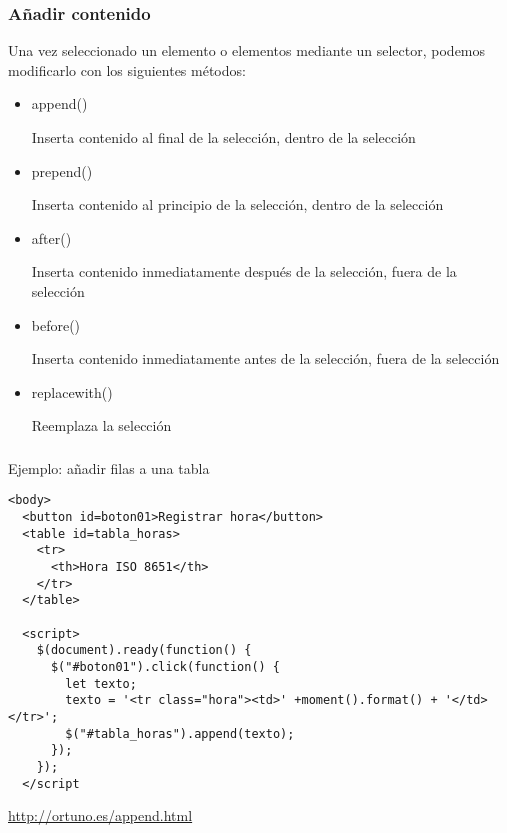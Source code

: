 \documentclass[ucs]{beamer}
\begin{document}
\begin{frame}[fragile]
\frametitle{Añadir contenido}
Una vez seleccionado un elemento o elementos
mediante un selector, podemos modificarlo con los siguientes métodos:

    \begin{itemize}
    \item
append()

Inserta contenido al final de la selección, dentro de la selección
    \item
prepend()

Inserta contenido al principio de la selección, dentro de la selección
    \item
after()

Inserta contenido inmediatamente después de la selección, fuera de la selección

    \item
before()

Inserta contenido inmediatamente antes de la selección, fuera de la selección

    \item
replacewith()

Reemplaza la selección
    \end{itemize}

\end{frame}


\begin{frame}[fragile]
\frametitle{}
Ejemplo: añadir filas a una tabla
  \begin{scriptsize}
  \begin{verbatim}
<body>
  <button id=boton01>Registrar hora</button>
  <table id=tabla_horas>
    <tr>
      <th>Hora ISO 8651</th>
    </tr>
  </table>

  <script>
    $(document).ready(function() {
      $("#boton01").click(function() {
        let texto;
        texto = '<tr class="hora"><td>' +moment().format() + '</td></tr>';
        $("#tabla_horas").append(texto);
      });
    });
  </script
  \end{verbatim}
  \end{scriptsize}

\begin{tiny}
\begin{flushright}
\url{http://ortuno.es/append.html}
\end{flushright}
\end{tiny}
\end{frame}
\end{document}
